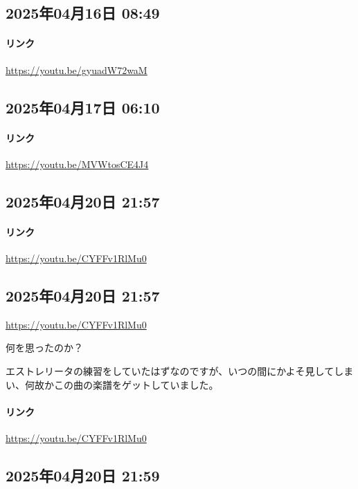 \subsection*{2025年04月16日 08:49}

\paragraph{リンク}
\url{https://youtu.be/gyuadW72waM}

\subsection*{2025年04月17日 06:10}

\paragraph{リンク}
\url{https://youtu.be/MVWtosCE4J4}

\subsection*{2025年04月20日 21:57}

\paragraph{リンク}
\url{https://youtu.be/CYFFv1RlMu0}

\subsection*{2025年04月20日 21:57}

\url{https://youtu.be/CYFFv1RlMu0}

何を思ったのか？

エストレリータの練習をしていたはずなのですが、いつの間にかよそ見してしまい、何故かこの曲の楽譜をゲットしていました。

\paragraph{リンク}
\url{https://youtu.be/CYFFv1RlMu0}

\subsection*{2025年04月20日 21:59}

